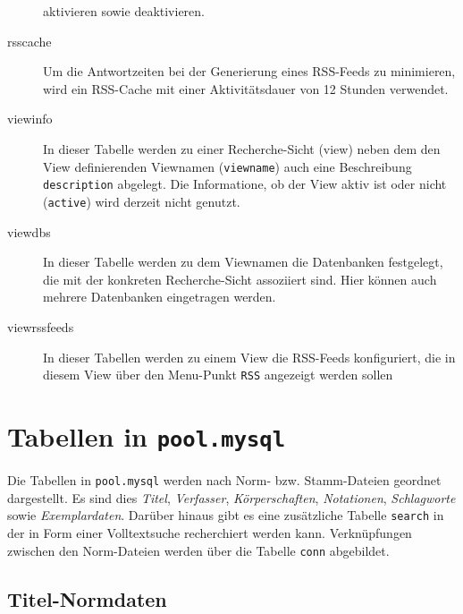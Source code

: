 \documentclass[11pt, twoside, a4paper, BCOR8mm, DIV12, bibtotoc,idxtotoc]{scrbook}
\begin{document}
\begin{description}
  aktivieren sowie deaktivieren.
\item[rsscache] Um die Antwortzeiten bei der Generierung eines
  RSS-Feeds zu minimieren, wird ein RSS-Cache mit einer
  Aktivitätsdauer von 12 Stunden verwendet.
\item[viewinfo] In dieser Tabelle werden zu einer Recherche-Sicht
  (view) neben dem den View de\-fi\-nier\-enden Viewnamen
  (\texttt{viewname}) auch eine Beschreibung \texttt{description}
  abgelegt. Die Informatione, ob der View aktiv ist oder nicht
  (\texttt{active}) wird derzeit nicht genutzt.
\item[viewdbs] In dieser Tabelle werden zu dem Viewnamen die Daten\-banken
  festgelegt, die mit der konkreten Recherche-Sicht assoziiert
  sind. Hier können auch mehrere Daten\-banken ein\-ge\-tra\-gen werden.
\item[viewrssfeeds] In dieser Tabellen werden zu einem View die
  RSS-Feeds konfiguriert, die in diesem View über den Menu-Punkt
  \texttt{RSS} angezeigt werden sollen

\end{description}



\chapter{Tabellen in \texttt{pool.mysql}}

Die Tabellen in \texttt{pool.mysql} werden nach Norm- bzw.
Stamm-Dateien geordnet dargestellt. Es sind dies \emph{Titel},
\emph{Verfasser}, \emph{Körperschaften}, \emph{Notationen},
\emph{Schlagworte} sowie \emph{Exemplardaten}. Darüber hinaus gibt es eine zusätzliche
Tabelle \texttt{search} in der in Form einer Volltextsuche
recherchiert werden kann. Verknüpfungen zwischen den Norm-Dateien
werden über die Tabelle \texttt{conn} abgebildet.

\section{Titel-Normdaten}
\end{document}

